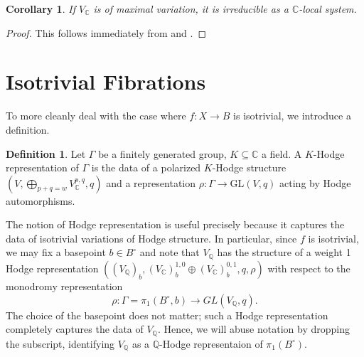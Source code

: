 \documentclass[12pt]{amsart}
\newcommand{\Q}{\mathbb{Q}}
\newcommand{\C}{\mathbb{C}}
\newcommand{\GL}{\text{GL}}
\newtheorem{corollary}[theorem]{Corollary}
\theoremstyle{definition}
\newtheorem{definition}[theorem]{Definition}
\theoremstyle{remark}
\numberwithin{equation}{section}
\begin{document}
\begin{corollary} \label{complex-irreducibility}
    If \(V_\C\) is of maximal variation, it is irreducible as a \(\C\)-local system.
\end{corollary}
\begin{proof}
This follows immediately from  and 
.
\end{proof}




\section{Isotrivial Fibrations}

To more cleanly deal with the case where \(f: X \to B\) is isotrivial, we introduce
a definition.

\begin{definition}
    Let \(\Gamma\) be a finitely generated group, \(K \subseteq \C\) a field.
    A \(K\)-Hodge representation of \(\Gamma\) is the data of a 
    polarized \(K\)-Hodge structure \((V, \bigoplus_{p+q=w} V_\C^{p,q}, q)\) and 
    a representation \(\rho: \Gamma \to \GL(V, q)\) acting by Hodge automorphisms.
\end{definition}


The notion of Hodge representation is useful precisely because it captures the 
data of isotrivial variations of Hodge structure. In particular,
since \(f\) is isotrivial, we may fix a basepoint \(b \in B^\circ\) and note 
that \(V_\Q\) has the structure of a weight 1 Hodge representation 
\(((V_\Q)_b, (V_\C)_b^{1,0} \oplus (V_\C)_b^{0,1}, q, \rho)\)
with respect to the monodromy representation
\[\rho: \Gamma = \pi_1(B^\circ, b) \to GL(V_\Q, q).\]
The choice of the basepoint does not matter; such a Hodge representation 
completely captures the data of \(V_\Q\). Hence, we will abuse notation by 
dropping the subscript, identifying \(V_\Q\) as a \(\Q\)-Hodge representaion
of \(\pi_1(B^\circ)\).
\end{document}

